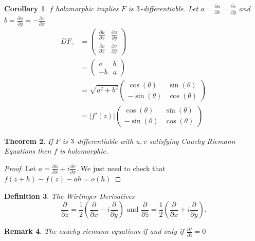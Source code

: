\documentclass[a4paper]{article}
\newtheorem{thm}{Theorem}[section]
\newtheorem{defn}[thm]{Definition}
\newtheorem{cor}[thm]{Corollary}
\newtheorem{rmk}[thm]{Remark}
\begin{document}
\begin{cor}
    $f$ holomorphic implies $F$ is $3$-differentiable. Let $a=\frac{\partial u }{\partial x}=\frac{\partial v}{\partial y}$ and $b=\frac{\partial u }{\partial y}=-\frac{\partial v}{\partial x}$
    \begin{align}
        DF_z&=\begin{pmatrix}
        {\frac{\partial u}{\partial x}} & {\frac{\partial u}{\partial y}} \\ 
        {\frac{\partial v}{\partial x}} & {\frac{\partial v}{\partial y}}
    \end{pmatrix}\\
    &=\begin{pmatrix}
        {a} & {b} \\ 
        {-b} & {a}
    \end{pmatrix}\\
    &=\sqrt{a^2+b^2}\begin{pmatrix}
        {\cos(\theta)} & {\sin(\theta)} \\ 
        {-\sin(\theta)} & {\cos(\theta)}
    \end{pmatrix}\\
    &= |f'(z)|\begin{pmatrix}
        {\cos(\theta)} & {\sin(\theta)} \\ 
        {-\sin(\theta)} & {\cos(\theta)}
    \end{pmatrix}
    \end{align}
\end{cor}
\begin{thm}
    If $F$ is $3$-differentiable with $u,v$ satisfying Cauchy Riemann Equations then $f$ is holomorphic. 
\end{thm}
\begin{proof}
    Let $a=\frac{\partial u}{\partial x}+i \frac{\partial v}{\partial x}$. We just need to check that $f(z+h)-f(z)-ah=o(h)$
\end{proof}
\begin{defn}
    The Wirtinger Derivatives
    \[
    \frac{\partial}{\partial z} = \frac{1}{2} \left( \frac{\partial}{\partial x}-i \frac{\partial}{\partial y}  \right) \text{ and } \frac{\partial}{\partial \overline{z}}=\frac{1}{2} \left( \frac{\partial}{\partial x}+i \frac{\partial}{\partial y} \right )  
    .\] 
\end{defn}
\begin{rmk}
    The cauchy-riemann equations if and only if $\frac{\partial f}{\partial \overline{z}}=0$
\end{rmk}
\end{document}
